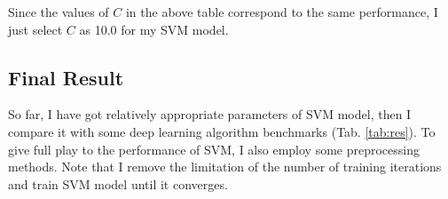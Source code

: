 \documentclass[12pt,a4paper]{article}
\theoremstyle{definition}
\begin{document}
\vspace{-0.005\linewidth}
Since the values of $C$ in the above table correspond to the same performance, I just select $C$ as 10.0 for my SVM model.

\vspace{-0.015\linewidth}
\subsection{Final Result}
\label{sec:final_res}

\vspace{-0.01\linewidth}
So far, I have got relatively appropriate parameters of SVM model, then I compare it with some deep learning algorithm benchmarks \cite{bench} (Tab. \ref{tab:res}). To give full play to the performance of SVM, I also employ some preprocessing methods. Note that I remove the limitation of the number of training iterations and train SVM model until it converges.
\end{document}
